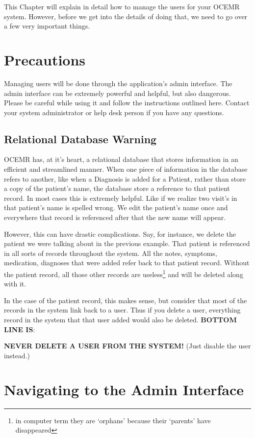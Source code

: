 This Chapter will explain in detail how to manage the users for your OCEMR
system. However, before we get into the details of doing that, we need to
go over a few very important things.

\section{Precautions}

Managing users will be done through the application’s admin interface.
The admin interface can be extremely powerful and helpful, but also
dangerous. Please be careful while using it and follow the instructions
outlined here. Contact your system administrator or help desk person if
you have any questions.

\subsection{Relational Database Warning}

  OCEMR has, at it’s heart, a relational database that stores information
in an efficient and streamlined manner. When one piece of information in
the database refers to another, like when a Diagnosis is added for a Patient,
rather than store a copy of the patient’s name, the database store a reference
to that patient record. In most cases this is extremely helpful. Like if we
realize two visit’s in that patient’s name is spelled wrong. We edit the
patient’s name once and everywhere that record is referenced after that the
new name will appear.

  However, this can have drastic complications. Say, for instance, we delete
the patient we were talking about in the previous example. That patient is
referenced in all sorts of records throughout the system. All the notes,
symptoms, medication, diagnoses that were added refer back to that patient
record. Without the patient record, all those other records are
useless\footnote{ in computer term they are ‘orphans’ because their
‘parents’ have disappeared } and will be deleted along with it.

  In the case of the patient record, this makes sense, but consider that
most of the records in the system link back to a user. Thus if you delete
a user, everything record in the system that that user added would also be
deleted. \textbf{BOTTOM LINE IS}:

\textbf{NEVER DELETE A USER FROM THE SYSTEM!} (Just disable the user instead.)

\section{Navigating to the Admin Interface}

